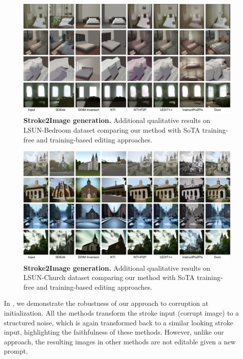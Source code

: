 \documentclass{article} %
\theoremstyle{plain}
\begin{document}
\begin{figure}[!tbh]
\includegraphics[width=\linewidth]{pics/stroke2image-supp_low.pdf}
\caption{
\textbf{Stroke2Image generation.}
Additional qualitative results on LSUN-Bedroom dataset comparing our method with SoTA training-free and training-based editing approaches. 
}
\label{fig:stroke2image-supp}
\end{figure}



\begin{figure}[!tbh]
\includegraphics[width=\linewidth]{pics/stroke2image-church-supp_low.pdf}
\caption{
\textbf{Stroke2Image generation.}
Additional qualitative results on LSUN-Church dataset comparing our method with SoTA training-free and training-based editing approaches. 
}
\label{fig:stroke2image-church-supp}
\end{figure}



In , we demonstrate the robustness of our approach to corruption at initialization.
All the methods transform the stroke input (corrupt image) to a structured noise, which is again transformed back to a similar looking stroke input, highlighting the faithfulness of these methods.
However, unlike our approach, the resulting images in other methods are not editable given a new prompt. 
\end{document}
